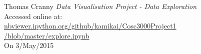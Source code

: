 \begin{thebibliography}{9}

    Thomas Cranny
    \textit{Data Visualisation Project - Data Exploration}\\
    Accessed online at:\\
    \href{http://nbviewer.ipython.org/github/kamikai/Cosc3000_Project1/blob/master/explore.ipynb}{nbviewer.ipython.org/github/kamikai/Cosc3000{\textunderscore}Project1 /blob/master/explore.ipynb}\\
    On 3/May/2015

\end{thebibliography}